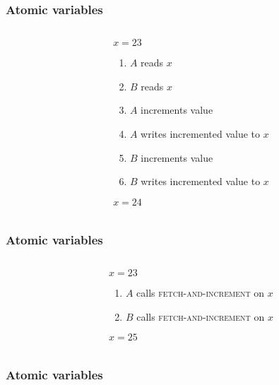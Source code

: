 \documentclass[aspectratio=1610]{beamer}
\begin{document}
  \begin{frame}
    \frametitle{Atomic variables}

    \begin{columns}
      \begin{column}{0.5\textwidth}
        \centering
        
      \end{column}
      \hfill
      \begin{column}{0.5\textwidth}
        $x = 23$

        \begin{enumerate}
          \item $A$ reads $x$
          \item $B$ reads $x$
          \item $A$ increments value
          \item $A$ writes incremented value to $x$
          \item $B$ increments value
          \item $B$ writes incremented value to $x$
        \end{enumerate}

        $x = 24$
      \end{column}
    \end{columns}
  \end{frame}

  \begin{frame}
    \frametitle{Atomic variables}

    \begin{columns}
      \begin{column}{0.5\textwidth}
        \centering
        
      \end{column}
      \hfill
      \begin{column}{0.5\textwidth}
        $x = 23$

        \begin{enumerate}
          \item $A$ calls \textsc{fetch-and-increment} on $x$
          \item $B$ calls \textsc{fetch-and-increment} on $x$
        \end{enumerate}

        $x = 25$
      \end{column}
    \end{columns}
  \end{frame}

  \begin{frame}
    \frametitle{Atomic variables}
    \centering
    
  \end{frame}
\end{document}
